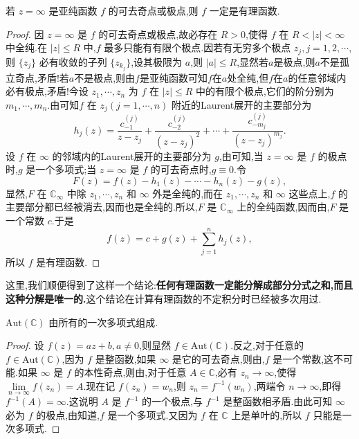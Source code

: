 \documentclass[../../main.tex]{subfiles}
\begin{document}
\begin{theorem}\label{theorem:定理5.3.3}
若 \( z = \infty \) 是亚纯函数 \( f \) 的可去奇点或极点,则 \( f \) 一定是有理函数.
\end{theorem}
\begin{proof}
因 \( z = \infty \) 是 \( f \) 的可去奇点或极点,故必存在 \( R > 0 \),使得 \( f \) 在 \( R < |z| < \infty \) 中全纯.在 \( |z| \leqslant R \) 中,\( f \) 最多只能有有限个极点.因若有无穷多个极点 \( z_j, j = 1, 2, \cdots \),则 \( \{ z_j \} \) 必有收敛的子列 \( \{ z_{k_j} \} \),设其极限为 \( a \),则 \( |a| \leqslant R \),显然若$a$是极点,则\( a \)不是孤立奇点,矛盾!若$a$不是极点,则由$f$是亚纯函数可知$f$在$a$处全纯,但$f$在$a$的任意邻域内必有极点,矛盾!今设 \( z_1, \cdots, z_n \) 为 \( f \) 在 \( |z| \leqslant R \) 中的有限个极点,它们的阶分别为 \( m_1, \cdots, m_n \).由可知\( f \) 在 \( z_j (j = 1, \cdots, n) \) 附近的Laurent展开的主要部分为
\[
h_j(z) = \frac{c_{-1}^{(j)}}{z - z_j} + \frac{c_{-2}^{(j)}}{(z - z_j)^2} + \cdots + \frac{c_{-m_j}^{(j)}}{(z - z_j)^{m_j}}.
\]
设 \( f \) 在 \( \infty \) 的邻域内的Laurent展开的主要部分为 \( g \),由可知,当 \( z = \infty \) 是 \( f \) 的极点时,\( g \) 是一个多项式;当 \( z = \infty \) 是 \( f \) 的可去奇点时,\( g \equiv 0 \).令
\[
F(z) = f(z) - h_1(z) - \cdots - h_n(z) - g(z),
\]
显然,\( F \) 在 \( \mathbb{C}_{\infty} \) 中除 \( z_1, \cdots, z_n \) 和 \( \infty \) 外是全纯的,而在 \( z_1, \cdots, z_n \) 和 \( \infty \) 这些点上,\( f \) 的主要部分都已经被消去,因而也是全纯的.所以,\( F \) 是 \( \mathbb{C}_{\infty} \) 上的全纯函数,因而由,\( F \) 是一个常数 \( c \).于是
\[
f(z) = c + g(z) + \sum_{j = 1}^{n} h_j(z),
\]
所以 \( f \) 是有理函数.

\end{proof}
\begin{remark}
这里,我们顺便得到了这样一个结论:\textbf{任何有理函数一定能分解成部分分式之和,而且这种分解是唯一的.}这个结论在计算有理函数的不定积分时已经被多次用过.
\end{remark}

\begin{theorem}\label{theorem:定理5.3.4}
\( \mathrm{Aut}(\mathbb{C}) \) 由所有的一次多项式组成.
\end{theorem}
\begin{proof}
设 \( f(z) = az + b, a \neq 0 \),则显然 \( f \in \mathrm{Aut}(\mathbb{C}) \).反之,对于任意的 \( f \in \mathrm{Aut}(\mathbb{C}) \),因为 \( f \) 是整函数,如果 \( \infty \) 是它的可去奇点,则由,\( f \) 是一个常数,这不可能.如果 \( \infty \) 是 \( f \) 的本性奇点,则由,对于任意 \( A \in \mathbb{C} \),必有 \( z_n \to \infty \),使得 \( \lim\limits_{n \to \infty} f(z_n) = A \).现在记 \( f(z_n) = w_n \),则 \( z_n = f^{-1}(w_n) \),两端令 \( n \to \infty \),即得 \( f^{-1}(A) = \infty \).这说明 \( A \) 是 \( f^{-1} \) 的一个极点,与 \( f^{-1} \) 是整函数相矛盾.由此可知 \( \infty \) 必为 \( f \) 的极点,由知道,\( f \) 是一个多项式.又因为 \( f \) 在 \( \mathbb{C} \) 上是单叶的,所以 \( f \) 只能是一次多项式.

\end{proof}
\end{document}
